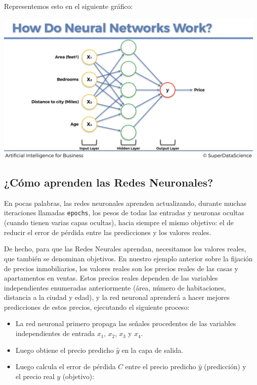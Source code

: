 \documentclass[]{book}
\providecommand{\tightlist}{%
  \setlength{\itemsep}{0pt}\setlength{\parskip}{0pt}}
\begin{document}
Representemos esto en el siguiente gráfico:

\includegraphics{Images/ANN_17.png}

\hypertarget{cuxf3mo-aprenden-las-redes-neuronales}{%
\subsection{¿Cómo aprenden las Redes Neuronales?}\label{cuxf3mo-aprenden-las-redes-neuronales}}

En pocas palabras, las redes neuronales aprenden actualizando, durante muchas iteraciones llamadas \texttt{epochs}, los pesos de todas las entradas y neuronas ocultas (cuando tienen varias capas ocultas), hacia siempre el mismo objetivo: el de reducir el error de pérdida entre las predicciones y los valores reales.

De hecho, para que las Redes Neurales aprendan, necesitamos los valores reales, que también se denominan objetivos. En nuestro ejemplo anterior sobre la fijación de precios inmobiliarios, los valores reales son los precios reales de las casas y apartamentos en ventas. Estos precios reales dependen de las variables independientes enumeradas anteriormente (área, número de habitaciones, distancia a la ciudad y edad), y la red neuronal aprenderá a hacer mejores predicciones de estos precios, ejecutando el siguiente proceso:

\begin{itemize}
\tightlist
\item
  La red neuronal primero propaga las señales procedentes de las variables independientes de entrada \(x_1\), \(x_2\), \(x_3\) y \(x_4\).
\item
  Luego obtiene el precio predicho \(\hat{y}\) en la capa de salida.\\
\item
  Luego calcula el error de pérdida \(C\) entre el precio predicho \(\hat{y}\) (predicción) y el precio real \(y\) (objetivo):
\end{itemize}
\end{document}
